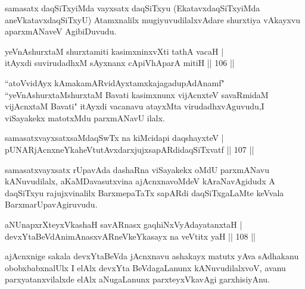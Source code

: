 \begin{artha}
samasatx daqSiTxyiMda vayxsatx daqSiTxyu (EkatavxdaqSiTxyiMda aneVkatavxdaqSiTxyU) Atamxnalilx mugiyuvudilalxvAdare shurxtiya vAkayxvu aparxmANaveV AgibiDuvudu.
\end{artha}

\begin{shl}
yeVnAshurxtaM shurxtamiti kasimxninxvXti tathA vacaH |\\
itAyxdi suvirudadhxM sAyxnanx cApiVhAparA mitiH \hfill || 106 ||
\end{shl}

\begin{artha}
``atoVvidAyx kAmakamARvidAyxtamxkajagadupAdAnamf" ``yeVnAshurxtaM\break shurxtaM Bavati  kasimxnunx vijAcnxteV savaRmidaM vijAcnxtaM Bavati" itAyxdi vacanavu atayxMta virudadhxvAguvudu,I viSayakekx matotxMdu 
parxmANavU ilalx.
\end{artha}


\begin{shl}
samasatxvayxsatxsaMdaqSwTx na kiMcidapi daqshayxteV |\\
pUNARjAcnxneYkaheVtutAvxdarxjujxsapARdidaqSiTxvatf \hfill || 107 ||
\end{shl}

\begin{artha}
samasatxvayxsatx rUpavAda dashaRna viSayakekx oMdU parxmANavu kANuvudilalx, aKaMDavasutxvina ajAcnxnavoMdeV kAraNavAgidudx A daqSiTxyu rajujxvinalilx BarxmepaTaTx sapARdi daqSiTxgaLaMte keVvala BarxmarUpavAgiruvudu.
\end{artha}


\begin{shl}
aNUnapxrXteyxVkashaH savARnasx gaqhiNxVyAdayatanxtaH |\\
devxYtaBeVdAnimAnasxvARneVkeYkasayx na veVtitx yaH \hfill || 108 ||
\end{shl}

\begin{artha}
ajAcnxnige sakala devxYtaBeVda jAcnxnavu ashakayx matutx yAva sAdhakanu obobxbabxnalUlx I elAlx devxYta BeVdagaLanunx kANuvudilalxvoV, avanu parxyatanxvilalxde elAlx aNugaLanunx parxteyxVkavAgi garxhisiyAnu.
\end{artha}


